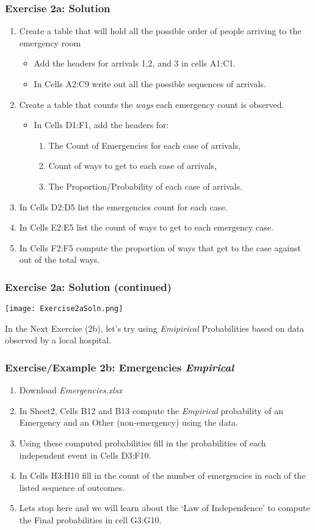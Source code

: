 \documentclass[12pt]{beamer}
\begin{document}
	\begin{frame}
		\frametitle{Exercise 2a: Solution}
		\begin{enumerate}
			\item Create a table that will hold all the possible order of people arriving to the emergency room
			\begin{itemize}
				\item Add the headers for arrivals 1,2, and 3 in cells A1:C1.
				\item In Cells A2:C9 write out all the possible sequences of arrivals.
			\end{itemize}
			\item Create a table that counts the \textit{ways} each emergency count is observed.
			\begin{itemize}
				\item In Cells D1:F1, add the headers for:
					\begin{enumerate}
						\item The Count of Emergencies for each case of arrivals,
						\item Count of ways to get to each case of arrivals,
						\item The Proportion/Probability of each case of arrivals.
					\end{enumerate}
			\end{itemize}
			\item In Cells D2:D5 list the emergencies count for each case.
			\item In Cells E2:E5 list the count of ways to get to each emergency case.
			\item In Cells F2:F5 compute the proportion of ways that get to the case against out of the total ways.
		\end{enumerate}
	\end{frame}
	\begin{frame}
		\frametitle{Exercise 2a: Solution (continued)}
			\begin{center}
				\texttt{[image: Exercise2aSoln.png]}
			\end{center}
		In the Next Exercise (2b), let's try using \textit{Emipirical} Probabilities based on data observed by a local hospital.
	\end{frame}
	\begin{frame}
		\frametitle{Exercise/Example 2b: Emergencies \textit{Empirical}}
		\begin{enumerate}
			\item Download \textit{Emergencies.xlsx}
			\item In Sheet2, Cells B12 and B13 compute the \textit{Empirical} probability of an Emergency and an Other (non-emergency) using the data.
			\item Using these computed probabilities fill in the probabilities of each independent event in Cells D3:F10.
			\item In Cells H3:H10 fill in the count of the number of emergencies in each of the listed sequence of outcomes. 
			\item Lets stop here and we will learn about the `Law of Independence' to compute the Final probabilities in cell G3:G10. 
		\end{enumerate}
	\end{frame}
\end{document}

